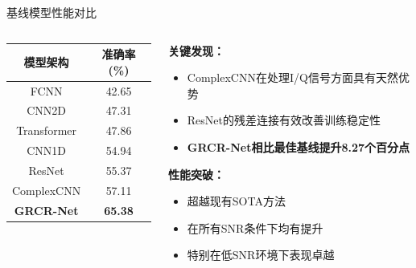\documentclass[aspectratio=169]{beamer}
\begin{document}
\begin{frame}{基线模型性能对比}
\begin{columns}
\begin{column}{0.5\textwidth}
\begin{table}[h]
\centering
\begin{tabular}{@{}cc@{}}
\toprule
\textbf{模型架构} & \textbf{准确率 (\%)} \\
\midrule
FCNN & 42.65 \\
CNN2D & 47.31 \\
Transformer & 47.86 \\
CNN1D & 54.94 \\
ResNet & 55.37 \\
ComplexCNN & 57.11 \\
\midrule
\textcolor{zjutred}{\textbf{GRCR-Net}} & \textcolor{zjutred}{\textbf{65.38}} \\
\bottomrule
\end{tabular}
\end{table}
\end{column}
\begin{column}{0.5\textwidth}
\textbf{关键发现：}
\begin{itemize}
\item ComplexCNN在处理I/Q信号方面具有天然优势
\item ResNet的残差连接有效改善训练稳定性
\item \textcolor{zjutred}{\textbf{GRCR-Net相比最佳基线提升8.27个百分点}}
\end{itemize}

\vspace{0.5cm}
\textbf{性能突破：}
\begin{itemize}
\item 超越现有SOTA方法
\item 在所有SNR条件下均有提升
\item 特别在低SNR环境下表现卓越
\end{itemize}
\end{column}
\end{columns}
\end{frame}
\end{document}
